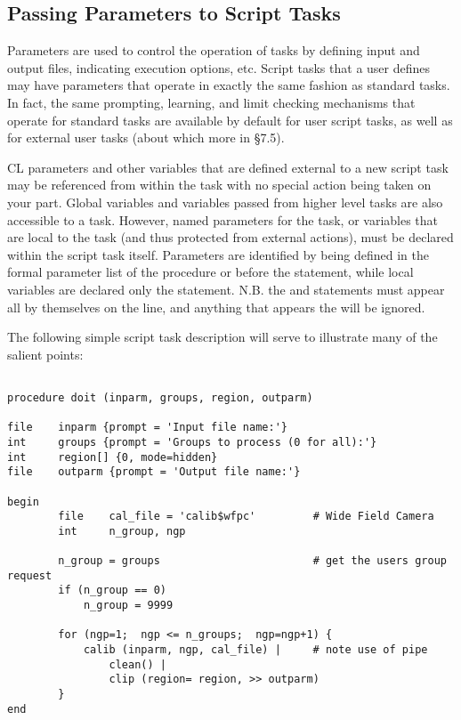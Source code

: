 \subsection{Passing Parameters to Script Tasks}

Parameters are used to control the operation of tasks by defining input 
and output files, indicating execution options, etc. Script tasks that a user
defines may have parameters that operate in exactly the same fashion 
as standard tasks.  
In fact, the same prompting, learning, and limit checking mechanisms
that operate for standard tasks are available by default for user script tasks,
as well as for external user tasks (about which more in \S 7.5).

CL parameters and other variables that are defined external to a new 
script task may be referenced from within the task with no special action
being taken on your part. Global variables and variables passed 
from higher level tasks
are also accessible to a task. However, named parameters for the task, 
or variables that are local to the task (and thus protected from 
external actions), must be declared within the script task itself.
Parameters are identified by being defined
in the formal parameter list of the procedure or before the 
statement, while local variables are declared only 
the  statement.  N.B. the  and 
 statements must appear all by themselves on the line, 
and anything that appears  the  will
be ignored.

The following simple script task description will serve to illustrate 
many of the salient points:

\begin{verbatim}

procedure doit (inparm, groups, region, outparm)

file    inparm {prompt = 'Input file name:'}
int     groups {prompt = 'Groups to process (0 for all):'}
int     region[] {0, mode=hidden}
file    outparm {prompt = 'Output file name:'}

begin
        file    cal_file = 'calib$wfpc'         # Wide Field Camera
        int     n_group, ngp

        n_group = groups                        # get the users group request
        if (n_group == 0)
            n_group = 9999

        for (ngp=1;  ngp <= n_groups;  ngp=ngp+1) {
            calib (inparm, ngp, cal_file) |     # note use of pipe
                clean() |
                clip (region= region, >> outparm)
        }
end 
\end{verbatim}

